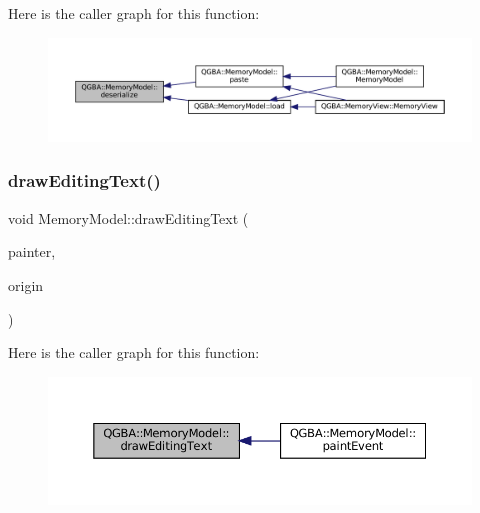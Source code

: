 Here is the caller graph for this function\+:
\nopagebreak
\begin{figure}[H]
\begin{center}
\leavevmode
\includegraphics[width=350pt]{class_q_g_b_a_1_1_memory_model_acb68f33a2d203e814ed2588409080d05_icgraph}
\end{center}
\end{figure}
\mbox{\label{class_q_g_b_a_1_1_memory_model_a8366db270c3f803caa5f403f14bb5448}} 
\subsubsection{\texorpdfstring{draw\+Editing\+Text()}{drawEditingText()}}
{\footnotesize\ttfamily void Memory\+Model\+::draw\+Editing\+Text (\begin{DoxyParamCaption}\item[{Q\+Painter \&}]{painter,  }\item[{const Q\+PointF \&}]{origin }\end{DoxyParamCaption})\hspace{0.3cm}{\ttfamily [private]}}

Here is the caller graph for this function\+:
\nopagebreak
\begin{figure}[H]
\begin{center}
\leavevmode
\includegraphics[width=350pt]{class_q_g_b_a_1_1_memory_model_a8366db270c3f803caa5f403f14bb5448_icgraph}
\end{center}
\end{figure}
\mbox{\label{class_q_g_b_a_1_1_memory_model_a6955aff7cf9ed1ef196aafdb0779707a}} 
